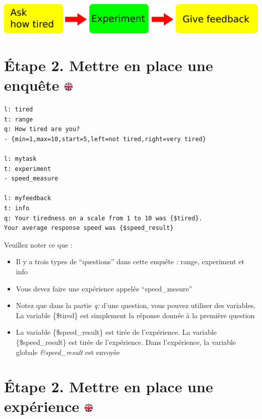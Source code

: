 \documentclass[
]{book}
\providecommand{\tightlist}{%
  \setlength{\itemsep}{0pt}\setlength{\parskip}{0pt}}
\begin{document}
\includegraphics{img/design_var_in_out.png}

\hypertarget{uxe9tape-2.-mettre-en-place-une-enquuxeate}{%
\section[Étape 2. Mettre en place une enquête ]{\texorpdfstring{Étape 2.
Mettre en place une enquête
\href{https://www.psytoolkit.org/lessons/var_in_out.html\#_step_2_setup_a_survey}{\protect\includegraphics{img/ukflag.png}}}{Étape 2. Mettre en place une enquête }}\label{uxe9tape-2.-mettre-en-place-une-enquuxeate}}

\begin{verbatim}
l: tired
t: range
q: How tired are you?
- {min=1,max=10,start=5,left=not tired,right=very tired}

l: mytask
t: experiment
- speed_measure

l: myfeedback
t: info
q: Your tiredness on a scale from 1 to 10 was {$tired}.
Your average response speed was {$speed_result}
\end{verbatim}

Veuillez noter ce que :

\begin{itemize}
\tightlist
\item
  Il y a trois types de ``questions'' dans cette enquête : range,
  experiment et info
\item
  Vous devez faire une expérience appelée ``speed\_mesure''
\item
  Notez que dans la partie \emph{q:} d'une question, vous pouvez
  utiliser des variables. La variable \{\$tired\} est simplement la
  réponse donnée à la première question
\item
  La variable \{\$speed\_result\} est tirée de l'expérience. La variable
  \{\$speed\_result\} est tirée de l'expérience. Dans l'expérience, la
  variable globale \emph{\&speed\_result} est envoyée
\end{itemize}

\hypertarget{uxe9tape-2.-mettre-en-place-une-expuxe9rience}{%
\section[Étape 2. Mettre en place une expérience ]{\texorpdfstring{Étape
2. Mettre en place une expérience
\href{https://www.psytoolkit.org/lessons/var_in_out.html\#_step_2_setup_an_experiment}{\protect\includegraphics{img/ukflag.png}}}{Étape 2. Mettre en place une expérience }}\label{uxe9tape-2.-mettre-en-place-une-expuxe9rience}}
\end{document}
